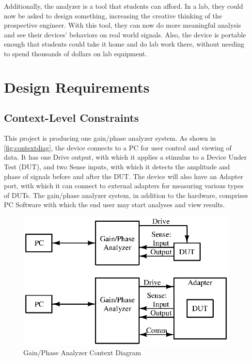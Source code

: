 Additionally, the analyzer is a tool that students can afford.  In a lab, they
could now be asked to design something, increasing the creative thinking of the
prospective engineer.  With this tool, they can now do more meaningful analysis
and see their devices' behaviors on real world signals.  Also, the device is
portable enough that students could take it home and do lab work there, without
needing to spend thousands of dollars on lab equipment.

\section{Design Requirements}

\subsection{Context-Level Constraints}

This project is producing one gain/phase analyzer system. As shown in \autoref{fig:contextdiag},
 the device connects to a PC for user control and viewing of data. It has one
Drive output, with which it applies a stimulus to a Device Under Test (DUT),
and two Sense inputs, with which it detects the amplitude and phase of signals
before and after the DUT. The device will also have an Adapter port, with which
it can connect to external adapters for measuring various types of DUTs.  The
gain/phase analyzer system, in addition to the hardware, comprises PC Software
with which the end user may start analyses and view results.

\begin{figure}[H]
\centering
\includegraphics{contextdiagram}
\caption{Gain/Phase Analyzer Context Diagram}
\label{fig:contextdiag}
\end{figure}

